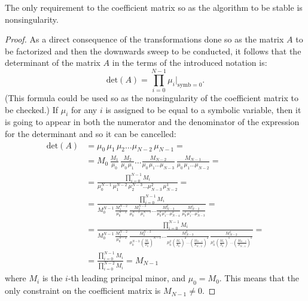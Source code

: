 \documentclass[10pt,a4paper]{amsart}
\begin{document}
\begin{theorem}
The only requirement to the coefficient matrix so as the algorithm to be
stable is nonsingularity.
\end{theorem}

\begin{proof}
As a direct consequence of the transformations done so as the matrix $A$ to be
factorized and then the downwards sweep to be conducted, it follows that the
determinant of the matrix $A$ in the terms of the introduced notation is:
\begin{equation}
\label{eq_1}
\textrm{det}(A) = \prod_{i=0}^{N-1}\mu_{i}|_{\textrm{symb}=0}.
\end{equation}
(This formula could be used so as the nonsingularity of the coefficient matrix
to be checked.)
If $\mu_{i}$ for any $i$ is assigned to be equal to a symbolic variable, then
it is going to appear in both the numerator and the denominator of the
expression for the determinant and so it can be cancelled:
\begin{equation}
\begin{aligned}
\label{eq_2}
\textrm{det}(A)
&= \mu_{0}\,\mu_{1}\,\mu_{2}\ldots\mu_{N-2}\,\mu_{N-1} = \\
&= M_{0}\,\frac{M_{1}}{\mu_{0}}\,\frac{M_{2}}{\mu_{0}\,\mu_{1}}\ldots
\frac{M_{N-2}}{\mu_{0}\,\mu_{1}\ldots\mu_{N-3}}\,\frac{M_{N-1}}
{\mu_{0}\,\mu_{1}\ldots\mu_{N-2}} = \\
& = \frac{\prod_{i=0}^{N-1}M_{i}}{\mu_{0}^{N-1}\,\mu_{1}^{N-2}\,\mu_{2}^{N-3}
\ldots\mu_{N-3}^{2}\,\mu_{N-2}^{1}} = \\
& = \frac{\prod_{i=0}^{N-1}M_{i}}{M_{0}^{N-1}\,\frac{M_{1}^{N-2}}{\mu_{0}^{N-2}}\,
\frac{M_{2}^{N-3}}{\mu_{0}^{N-3}\,\mu_{1}^{N-3}}\ldots\frac{M_{N-3}^{2}}
{\mu_{0}^{2}\,\mu_{1}^{2}\ldots\mu_{N-4}^{2}}\,\frac{M_{N-2}^{1}}{\mu_{0}^{1}\,
\mu_{1}^{1}\ldots\mu_{N-3}^{1}}} = \\
& = \frac{\prod_{i=0}^{N-1}M_{i}}{M_{0}^{N-1}\,\frac{M_{1}^{N-2}}{\mu_{0}^{N-2}}\,
\frac{M_{2}^{N-3}}{\mu_{0}^{N-3}\,\left(\frac{M_{1}}{\mu_{0}}\right)^{N-3}}\ldots
\frac{M_{N-3}^{2}}
{\mu_{0}^{2}\,\left(\frac{M_{1}}{\mu_{0}}\right)^{2}\ldots
\left(\frac{M_{N-4}}{\mu_{N-3}}\right)^{2}}\,\frac{M_{N-2}^{1}}{\mu_{0}^{1}\,
\left(\frac{M_{1}}{\mu_{0}}\right)^{1}\ldots\left(\frac{M_{N-3}}{\mu_{N-4}}\right)^{1}}} = \\
& = \frac{\prod_{i=0}^{N-1}M_{i}}{\prod_{i=0}^{N-2}M_{i}} = M_{N-1}
\end{aligned}
\end{equation}
where $M_{i}$ is the $i$-th leading principal minor, and $\mu_{0} = M_{0}$.
This means that the only constraint on the coefficient matrix is $M_{N-1}\neq0$.
\end{proof}
\end{document}

